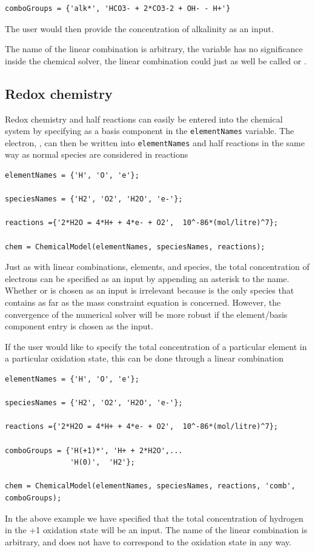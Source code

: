\documentclass{article}
\begin{document}
\begin{lstlisting}
comboGroups = {'alk*', 'HCO3- + 2*CO3-2 + OH- - H+'}
\end{lstlisting}
The user would then provide the concentration of alkalinity as an input. 

The name of the linear combination is arbitrary, the variable  has no significance inside the chemical solver, the linear combination could just as well be called  or . 

\subsection{Redox chemistry}

Redox chemistry and half reactions can easily be entered into the chemical system by specifying  as a basis component in the \verb|elementNames| variable. The electron, , can then be written into \verb|elementNames| and half reactions in the same way as normal species are considered in reactions

\begin{lstlisting}
elementNames = {'H', 'O', 'e'};

speciesNames = {'H2', 'O2', 'H2O', 'e-'};

reactions ={'2*H2O = 4*H+ + 4*e- + O2',  10^-86*(mol/litre)^7};

chem = ChemicalModel(elementNames, speciesNames, reactions);
\end{lstlisting}
Just as with linear combinations, elements, and species, the total concentration of electrons can be specified as an input by appending an asterisk to the name. Whether  or  is chosen as an input is irrelevant because  is the only species that contains  as far as the mass constraint equation is concerned. However, the convergence of the numerical solver will be more robust if the element/basis component entry is chosen as the input. 

If the user would like to specify the total concentration of a particular element in a particular oxidation state, this can be done through a linear combination

\begin{lstlisting}
elementNames = {'H', 'O', 'e'};

speciesNames = {'H2', 'O2', 'H2O', 'e-'};

reactions ={'2*H2O = 4*H+ + 4*e- + O2',  10^-86*(mol/litre)^7};

comboGroups = {'H(+1)*', 'H+ + 2*H2O',...
               'H(0)',  'H2'};

chem = ChemicalModel(elementNames, speciesNames, reactions, 'comb', comboGroups);
\end{lstlisting}
In the above example we have specified that the total concentration of hydrogen in the +1 oxidation state will be an input. The name of the linear combination is arbitrary, and does not have to correspond to the oxidation state in any way. 
\end{document}
